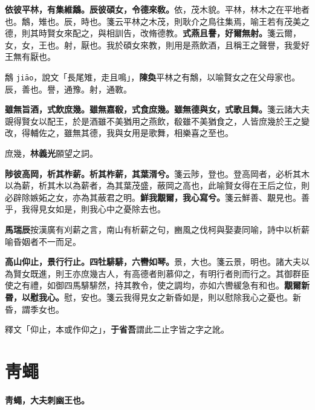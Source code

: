 \textbf{依彼平林，有集維鷮。辰彼碩女，令德來敎。}{\footnotesize 依，茂木貌。平林，林木之在平地者也。鷮，雉也。辰，時也。箋云平林之木茂，則耿介之鳥往集焉，喻王若有茂美之德，則其時賢女來配之，與相訓告，改脩德教。}\textbf{式燕且譽，好爾無射。}{\footnotesize 箋云爾，女，女，王也。射，厭也。我於碩女來教，則用是燕飲酒，且稱王之聲譽，我愛好王無有厭也。}

\begin{quoting}鷮 \texttt{jiāo}，說文「長尾雉，走且鳴」，\textbf{陳奐}平林之有鷮，以喻賢女之在父母家也。辰，善也。譽，通豫。射，通斁。\end{quoting}

\textbf{雖無旨酒，式飲庶幾。雖無嘉殽，式食庶幾。雖無德與女，式歌且舞。}{\footnotesize 箋云諸大夫覬得賢女以配王，於是酒雖不美猶用之燕飲，殽雖不美猶食之，人皆庶幾於王之變改，得輔佐之，雖無其德，我與女用是歌舞，相樂喜之至也。}

\begin{quoting}庶幾，\textbf{林義光}願望之詞。\end{quoting}

\textbf{陟彼高岡，析其柞薪。析其柞薪，其葉湑兮。}{\footnotesize 箋云陟，登也。登高岡者，必析其木以為薪，析其木以為薪者，為其葉茂盛，蔽岡之高也，此喻賢女得在王后之位，則必辟除嫉妬之女，亦為其蔽君之明。}\textbf{鮮我覯爾，我心寫兮。}{\footnotesize 箋云鮮善、覯見也。善乎，我得見女如是，則我心中之憂除去也。}

\begin{quoting}\textbf{馬瑞辰}按漢廣有刈薪之言，南山有析薪之句，豳風之伐柯與娶妻同喻，詩中以析薪喻昏姻者不一而足。\end{quoting}

\textbf{高山仰止，景行行止。四牡騑騑，六轡如琴。}{\footnotesize 景，大也。箋云景，明也。諸大夫以為賢女既進，則王亦庶幾古人，有高德者則慕仰之，有明行者則而行之。其御群臣使之有禮，如御四馬騑騑然，持其教令，使之調均，亦如六轡緩急有和也。}\textbf{覯爾新昬，以慰我心。}{\footnotesize 慰，安也。箋云我得見女之新昏如是，則以慰除我心之憂也。新昏，謂季女也。}

\begin{quoting}釋文「仰止，本或作仰之」，\textbf{于省吾}謂此二止字皆之字之訛。\end{quoting}

\section{靑蠅}


\textbf{靑蠅，大夫刺幽王也。}

